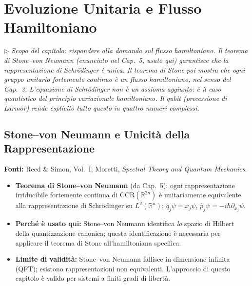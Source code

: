 \documentclass[12pt, a4paper]{article}
\newcommand{\fonti}[1]{%
	\begin{fontebox}
		\textcolor{fontecolor}{\footnotesize\textbf{Fonti:} #1}
	\end{fontebox}%
}
\newcommand{\nota}[1]{%
	\par\smallskip
	\noindent\textit{\small $\triangleright$\; #1}
	\par\smallskip
}
\begin{document}
	\newpage
	\section{Evoluzione Unitaria e Flusso Hamiltoniano}
	
	\nota{Scopo del capitolo: rispondere alla domanda sul flusso hamiltoniano. Il teorema
		di Stone--von Neumann (enunciato nel Cap.\ 5, usato qui) garantisce che la
		rappresentazione di Schrödinger è unica. Il teorema di Stone poi mostra che ogni
		gruppo unitario fortemente continuo è un flusso hamiltoniano, nel senso del Cap.\ 3.
		L'equazione di Schrödinger non è un assioma aggiunto: è il caso quantistico del
		principio variazionale hamiltoniano. Il qubit (precessione di Larmor) rende
		esplicito tutto questo in quattro numeri complessi.}
	
	\subsection{Stone--von Neumann e Unicità della Rappresentazione}
	
	\fonti{Reed \& Simon, Vol.~I; Moretti, \textit{Spectral Theory and Quantum Mechanics}.}
	
	\begin{itemize}
		\item \textbf{Teorema di Stone--von Neumann} (da Cap.\ 5): ogni rappresentazione
		irriducibile fortemente continua di $\mathrm{CCR}(\mathbb{R}^{2n})$ è
		unitariamente equivalente alla rappresentazione di Schrödinger su $L^2(\mathbb{R}^n)$;
		$\hat{q}_j \psi = x_j \psi$, $\hat{p}_j \psi = -i\hbar\partial_{x_j}\psi$.
		\item \textbf{Perché è usato qui:} Stone--von Neumann identifica \emph{lo} spazio
		di Hilbert della quantizzazione canonica; questa identificazione è necessaria per
		applicare il teorema di Stone all'hamiltoniana specifica.
		\item \textbf{Limite di validità:} Stone--von Neumann fallisce in dimensione
		infinita (QFT); esistono rappresentazioni non equivalenti. L'approccio di questo
		capitolo è valido per sistemi a finiti gradi di libertà.
	\end{itemize}
	
\end{document}
